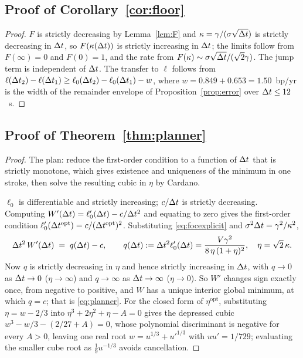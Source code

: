 \subsection{Proof of Corollary~\ref{cor:floor}}\label{app:corfloor}

\begin{proof}
$F$ is strictly decreasing by Lemma~\ref{lem:F} and $\kappa = \gamma/(\sigma\sqrt{\Delta t})$ is strictly decreasing in $\Delta t$, so $F(\kappa(\Delta t))$ is strictly increasing in $\Delta t$; the limits follow from $F(\infty)=0$ and $F(0)=1$, and the rate from $F(\kappa)\sim\sigma\sqrt{\Delta t}/(\sqrt2\gamma)$. The jump term is independent of $\Delta t$. The transfer to $\ell$ follows from $\ell(\Delta t_2)-\ell(\Delta t_1) \ge \ell_0(\Delta t_2)-\ell_0(\Delta t_1) - w$, where $w = 0.849+0.653 = 1.50$~bp/yr is the width of the remainder envelope of Proposition~\ref{prop:error} over $\Delta t\le12$~s.
\end{proof}

\subsection{Proof of Theorem~\ref{thm:planner}}\label{app:planner}

\begin{proof}
The plan: reduce the first-order condition to a function of $\Delta t$ that is strictly monotone, which gives existence and uniqueness of the minimum in one stroke, then solve the resulting cubic in $\eta$ by Cardano.

$\ell_0$ is differentiable and strictly increasing; $c/\Delta t$ is strictly decreasing. Computing $W'(\Delta t) = \ell_0'(\Delta t) - c/\Delta t^2$ and equating to zero gives the first-order condition $\ell_0'(\Delta t^{\mathrm{opt}}) = c/(\Delta t^{\mathrm{opt}})^2$. Substituting \eqref{eq:focexplicit} and $\sigma^2\Delta t = \gamma^2/\kappa^2$,
\[
\Delta t^2\,W'(\Delta t) \;=\; q(\Delta t) - c, \qquad q(\Delta t) := \Delta t^2\ell_0'(\Delta t) = \frac{V\gamma^2}{8\,\eta\,(1+\eta)^2},\quad \eta = \sqrt2\,\kappa .
\]
Now $q$ is strictly decreasing in $\eta$ and hence strictly increasing in $\Delta t$, with $q\to0$ as $\Delta t\to0$ ($\eta\to\infty$) and $q\to\infty$ as $\Delta t\to\infty$ ($\eta\to0$). So $W'$ changes sign exactly once, from negative to positive, and $W$ has a unique interior global minimum, at which $q = c$; that is \eqref{eq:planner}. For the closed form of $\eta^{\mathrm{opt}}$, substituting $\eta = w-2/3$ into $\eta^3+2\eta^2+\eta-A=0$ gives the depressed cubic $w^3-w/3-(2/27+A)=0$, whose polynomial discriminant is negative for every $A>0$, leaving one real root $w = u^{1/3}+u'^{1/3}$ with $uu'=1/729$; evaluating the smaller cube root as $\tfrac19u^{-1/3}$ avoids cancellation.
\end{proof}

